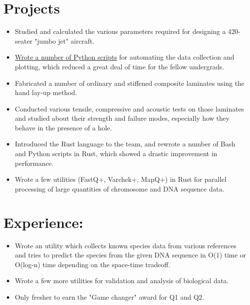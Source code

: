 \documentclass[11pt,a4paper,sans]{moderncv}        %
\newcommand\chref[3][linky]{\href{#2}{\color{#1}#3}}
\begin{document}
\section{Projects}
{\begin{itemize}
\item Studied and calculated the various parameters required for designing a 420-seater "jumbo jet" aircraft.
\item \chref{https://github.com/Wafflespeanut/scripts/tree/5610248de2d47311f128fecd015e2af8becca26f/python/Course}{Wrote a number of Python scripts} for automating the data collection and plotting, which reduced a great deal of time for the fellow undergrads.
\end{itemize}}
{\begin{itemize}
\item Fabricated a number of ordinary and stiffened composite laminates using the hand lay-up method.
\item Conducted various tensile, compressive and acoustic tests on those laminates and studied about their strength and failure modes, especially how they behave in the presence of a hole.
\end{itemize}}
{\begin{itemize}
\item Introduced the Rust language to the team, and rewrote a number of Bash and Python scripts in Rust, which showed a drastic improvement in performance.
\item Wrote a few utilities (FastQ+, Varchek+, MapQ+) in Rust for parallel processing of large quantities of chromosome and DNA sequence data.
\end{itemize}}

\section{Experience:}
{\begin{itemize}
\item Wrote an utility which collects known species data from various references and tries to predict the species from the given DNA sequence in O(1) time or O(log-n) time depending on the space-time tradeoff.
\item Wrote a few more utilities for validation and analysis of biological data.
\item Only fresher to earn the "Game changer" award for Q1 and Q2.
\end{itemize}}
\end{document}
